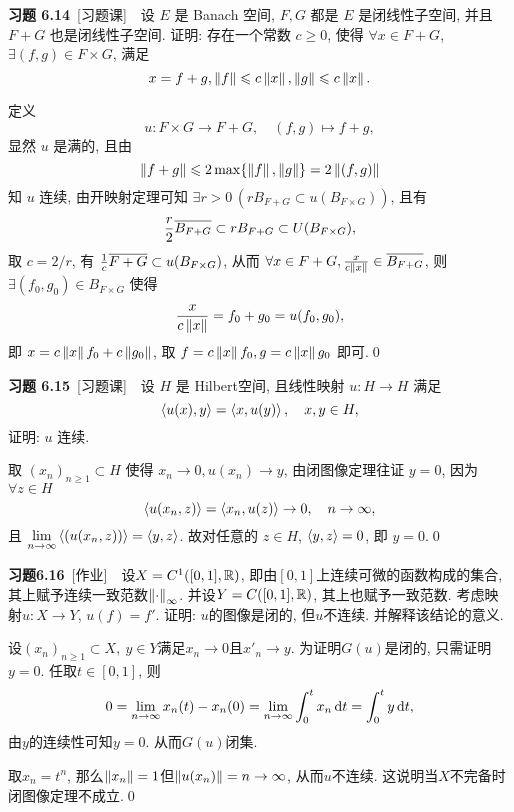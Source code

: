 	\textbf{习题 6.14}\ [习题课]\ \ 设 $ E $ 是 Banach 空间, $ F, G $ 都是 $ E $ 是闭线性子空间, 并且 $ F+G $ 也是闭线性子空间. 证明: 存在一个常数 $ c\geqslant0 $, 使得 $ \forall x\in F+G $, $ \exists(f, g)\in F\times G $, 满足
	\[
		x=f+g, \norm{f}\leqslant c\norm{x}, \norm{g}\leqslant c\norm{x}.
	\]
	\begin{Proof}
		定义
		\[
			u:F\times G\to F+G,\quad (f, g)\mapsto f+g,
		\]
		显然 $ u $ 是满的, 且由 
		\[
			\norm{f+g}\leqslant 2\max\{ \norm{f}, \norm{g} \}=2\norm{(f, g)}
		\]
		知 $ u $ 连续, 由开映射定理可知 $ \exists r>0\,(rB_{F+G}\subset u(B_{F\times G})) $, 且有
		\[
			\frac{r}{2}\baro{B_{F+G}}\subset rB_{F+G}\subset U(B_{F\times G}),
		\]
		取 $ c=2/r $, 有 $ \frac{1}{c}\baro{F+G}\subset u(B_{F\times G}) $, 从而 $ \forall x\in F+G, \frac{x}{c\norm{x}}\in\baro{B_{F+G}} $, 则 $ \exists (f_{0}, g_{0})\in B_{F\times G} $ 使得
		\[
			\frac{x}{c\norm{x}}=f_{0}+g_{0}=u(f_{0}, g_{0}),
		\]
		即 $ x = c\norm{x}f_{0}+c\norm{g_{0}} $, 取 $ f=c\norm{x}f_{0} , g = c\norm{x}g_{0} $ 即可.\qed
	\end{Proof}
	
	\textbf{习题 6.15}\ [习题课]\ \ 设 $ H $ 是 Hilbert空间, 且线性映射 $ u:H\to H $ 满足
	\[
		\lrangle{u(x), y}=\lrangle{x, u(y)}, \quad x, y\in H,
	\]
	证明: $ u $ 连续.
	\begin{Proof}
		取 $ (x_{n})_{n\geqslant1}\subset H $ 使得 $ x_{n}\to 0, u(x_{n})\to y $, 由闭图像定理往证 $ y=0 $, 因为 $ \forall z\in H $
		\[
			\lrangle{u(x_{n}, z)}=\lrangle{x_{n}, u(z)}\to 0,\quad n\to \infty,
		\]
		且 $ \lim\limits_{n\to\infty}\lrangle{(u(x_{n}, z))}=\lrangle{y, z} $. 故对任意的 $ z\in H $, $ \lrangle{y, z}=0 $, 即 $ y=0 $.\qed
	\end{Proof}
	
	\textbf{习题6.16}\ [作业]\ \ 设$ X=C^1([0,1],\R) $, 即由$ [0,1] $上连续可微的函数构成的集合, 其上赋予连续一致范数$ \norm\cdot_\infty $. 并设$ Y=C([0,1],\R) $, 其上也赋予一致范数. 考虑映射$ u : X\to Y $, $ u(f)=f' $. 证明: $ u $的图像是闭的, 但$ u $不连续. 并解释该结论的意义.
	\begin{Proof}
	设$ (x_n)_{n\geqslant 1}\subset X,\ y\in Y $满足$ x_n\to 0 $且$ x'_n\to y $. 为证明$ G(u) $是闭的, 只需证明$ y=0 $. 任取$ t\in[0,1] $, 则
	\[
	0=\lim_{n\to\infty}x_n(t)-x_n(0)=\lim_{n\to\infty}\int_0^tx_n\diff t=\int_0^ty\diff t,
	\]
	由$ y $的连续性可知$ y=0 $. 从而$ G(u) $闭集.
	
	取$ x_n=t^n $, 那么$ \norm{x_n}=1 $但$ \norm{u(x_n)}=n\to\infty $, 从而$ u $不连续. 这说明当$ X $不完备时闭图像定理不成立.\qed
	\end{Proof}

